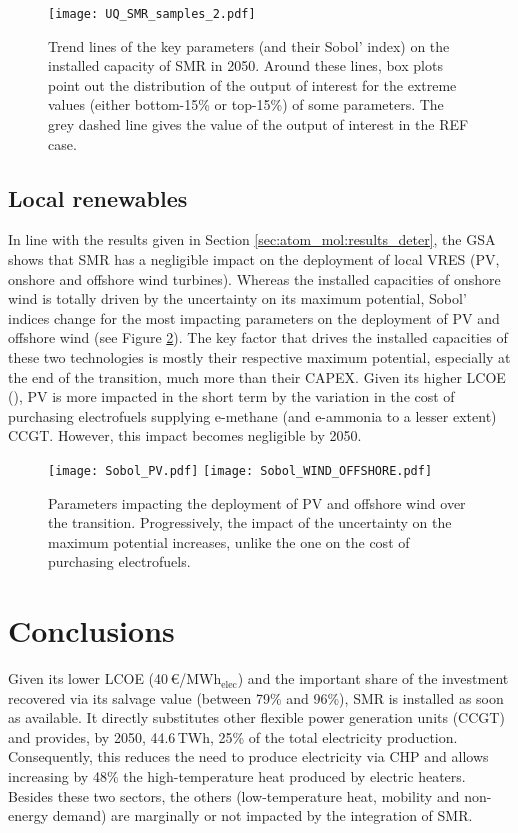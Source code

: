 \begin{figure}[htbp!]
\centering
\texttt{[image: UQ\_SMR\_samples\_2.pdf]}
\caption{Trend lines of the key parameters (and their Sobol' index) on the installed capacity of \gls{SMR} in 2050. Around these lines, box plots point out the distribution of the output of interest for the extreme values (either bottom-15\% or top-15\%) of some parameters. The grey dashed line gives the value of the output of interest in the REF case. }
\label{fig:results_uq_samples_SMR}
\end{figure}

\newpage
\subsection{Local renewables}
\label{subsec:atom_mol:results_uq_VRES}
In line with the results given in Section \ref{sec:atom_mol:results_deter}, the \gls{GSA} shows that \gls{SMR} has a negligible impact on the deployment of local \gls{VRES} (\ie \gls{PV}, onshore and offshore wind turbines). Whereas the installed capacities of onshore wind is totally driven by the uncertainty on its maximum potential, Sobol' indices change for the most impacting parameters on the deployment of \gls{PV} and offshore wind (see Figure \ref{fig:results_uq_pdf_local_ren}). The key factor that drives the installed capacities of these two technologies is mostly their respective maximum potential, especially at the end of the transition, much more than their CAPEX. Given its higher \gls{LCOE} (), \gls{PV} is more impacted in the short term by the variation in the cost of purchasing electrofuels supplying e-methane (and e-ammonia to a lesser extent) \gls{CCGT}. However, this impact becomes negligible by 2050.

\begin{figure}[htbp!]
\centering
\texttt{[image: Sobol\_PV.pdf]}
\texttt{[image: Sobol\_WIND\_OFFSHORE.pdf]}
\caption{Parameters impacting the deployment of \gls{PV} and offshore wind over the transition. Progressively, the impact of the uncertainty on the maximum potential increases, unlike the one on the cost of purchasing electrofuels.}
\label{fig:results_uq_pdf_local_ren}
\end{figure}


\section{Conclusions}
\label{sec:atom_mol:conclusions}
Given its lower \gls{LCOE} (40\,€/MWh$_{\text{elec}}$) and the important share of the investment recovered via its salvage value (between 79\% and 96\%), \gls{SMR} is installed as soon as available. It directly substitutes other flexible power generation units (\ie CCGT) and provides, by 2050, 44.6\,TWh, 25\% of the total electricity production. Consequently, this reduces the need to produce electricity via \gls{CHP} and allows increasing by 48\% the high-temperature heat produced by electric heaters. Besides these two sectors, the others (\ie low-temperature heat, mobility and non-energy demand) are marginally or not impacted by the integration of \gls{SMR}.

